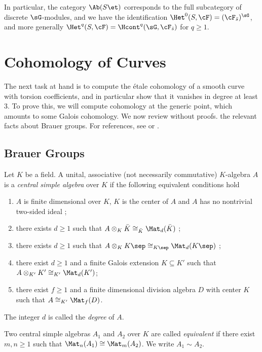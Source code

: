 In particular, the category $\Ab(S\et)$ corresponds to the full subcategory of discrete $\sG$-modules, and we have the identification $\Het^0(S,\cF) = (\cF_{\bar s})^\sG$, and more generally $\Het^q(S,\cF) = \Hcont^q (\sG, \cF_{\bar s})$ for $q \geqslant 1$.
\section{Cohomology of Curves}

The next task at hand is to compute the \'etale cohomology of a smooth curve with torsion coefficients, and in particular show that it vanishes in degree at least 3. To prove this, we will compute cohomology at the generic point, which amounts to some Galois cohomology. We now review without proofs. the relevant facts about Brauer groups. For references, see \cite{SerreAlgebra} or \cite{WeilNumberTheory}.

\subsection{Brauer Groups}

\begin{defithm} \label{defthm:CSA}
Let $K$ be a field. A unital, associative (not necessarily commutative) $K$-algebra $A$ is a \emph{central simple algebra} over $K$ if the following equivalent conditions hold
\begin{enumerate}[\it i.]
\item
$A$ is finite dimensional over $K$, $K$ is the center of $A$ and $A$ has no nontrivial two-sided ideal ;
\item
there exists $d \geqslant 1$ such that $A \otimes_K \bar K \cong_{\bar K} \Mat_d(\bar K)$ ;
\item
there exists $d \geqslant 1$ such that $A \otimes_K K\sep \cong_{K\sep} \Mat_d(K\sep)$ ;
\item
there exist $d \geqslant 1$ and a finite Galois extension $K \subseteq K'$ such that $A \otimes_{K'} K' \cong_{K'} \Mat_d(K')$; 
\item
there exist $f \geqslant 1$ and a finite dimensional division algebra $D$ with center $K$ such that $A \cong_{K'} \Mat_f(D)$.
\end{enumerate}
The integer $d$ is called the \emph{degree} of $A$. 
\end{defithm}

\begin{defi}
Two central simple algebras $A_1$ and $A_2$ over $K$ are called \emph{equivalent} if there exist $m, n \geqslant 1$ such that $\Mat_n(A_1) \cong \Mat_m(A_2)$. We write $A_1 \sim A_2$.
\end{defi}


